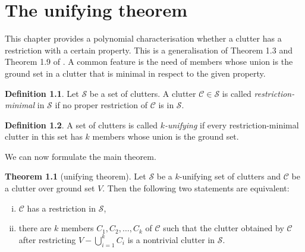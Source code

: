 \documentclass[a4paper, 12pt, twoside=false]{scrbook}
\theoremstyle{definition}
\newtheorem*{definition}{Definition}
\newtheorem{theorem}{Theorem}[chapter]
\begin{document}
\chapter{The unifying theorem}
This chapter provides a polynomial characterisation whether a clutter has a restriction with a certain property.
This is a generalisation of Theorem 1.3 and Theorem 1.9 of \cite{restrictions}.
A common feature is the need of members whose union is the ground set in a clutter that is minimal in respect to the given property.
   \begin{definition}
       Let $\mathcal{S}$ be a set of clutters.
       A clutter $\mathcal{C} \in \mathcal{S}$ is called \emph{restriction-minimal} in $\mathcal{S}$ if no proper restriction of $\mathcal{C}$ is in $\mathcal{S}$.
   \end{definition}

   \begin{definition}
       A set of clutters is called \emph{$k$-unifying} if every restriction-minimal clutter in this set has $k$ members whose union is the ground set.
   \end{definition}

   We can now formulate the main theorem.

   \begin{theorem}[unifying theorem]\label{unifying}
       Let $\mathcal{S}$ be a $k$-unifying set of clutters and $\mathcal{C}$ be a clutter over ground set $V$.
       Then the following two statements are equivalent:
       \leavevmode
       \begin{enumerate}[(i)]
           \item $\mathcal{C}$ has a restriction in $\mathcal{S}$,
           \item there are $k$ members $C_1, C_2, \ldots, C_k$ of $\mathcal{C}$ such that the clutter obtained by $\mathcal{C}$ after restricting $V - \bigcup_{i=1}^k C_i$ is a nontrivial clutter in $\mathcal{S}$.
       \end{enumerate}
   \end{theorem}
\end{document}
